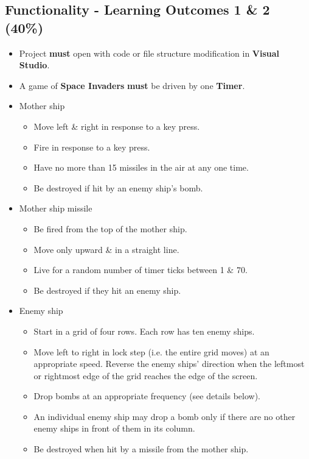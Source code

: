 \documentclass{article}
\begin{document}
\subsection*{Functionality - Learning Outcomes 1 \& 2 (40\%)}
\begin{itemize}
    \item Project \textbf{must} open with code or file structure modification in \textbf{Visual Studio}.
    \item A game of \textbf{Space Invaders} \textbf{must} be driven by one \textbf{Timer}.
    \item Mother ship
    \begin{itemize}
        \item Move left \& right in response to a key press.
        \item Fire in response to a key press.
        \item Have no more than 15 missiles in the air at any one time.
        \item Be destroyed if hit by an enemy ship's bomb.
    \end{itemize}
    \item Mother ship missile
    \begin{itemize}
        \item Be fired from the top of the mother ship.
        \item Move only upward \& in a straight line.
        \item Live for a random number of timer ticks between 1 \& 70.
        \item Be destroyed if they hit an enemy ship.
    \end{itemize}
    \item Enemy ship
    \begin{itemize}
        \item Start in a grid of four rows. Each row has ten enemy ships.
        \item Move left to right in lock step (i.e. the entire grid moves) at an appropriate speed. Reverse the enemy ships' direction when the leftmost or rightmost edge of the grid reaches the edge of the screen.
        \item Drop bombs at an appropriate frequency (see details below).
        \item An individual enemy ship may drop a bomb only if there are no other enemy ships in front of them in its column.
        \item Be destroyed when hit by a missile from the mother ship.
    \end{itemize}

\end{itemize}
\end{document}
